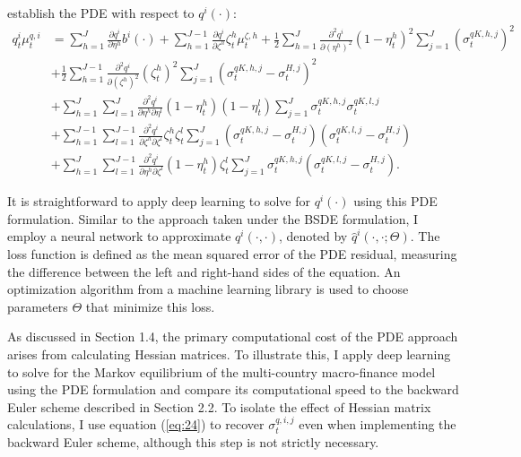 \documentclass{article}
\begin{document}
establish the PDE with respect to $q^{i}(\cdot)$:
\begin{align*}
q_{t}^{i}\mu_{t}^{q,i}&=\sum_{h=1}^{J}\frac{\partial q^{i}}{\partial\eta^{h}}b^{i}(\cdot)+\sum_{h=1}^{J-1}\frac{\partial q^{i}}{\partial\zeta^{h}}\zeta_{t}^{h}\mu_{t}^{\zeta,h}+\frac{1}{2}\sum_{h=1}^{J}\frac{\partial^{2}q^{i}}{\partial(\eta^{h})^{2}}(1-\eta_{t}^{h})^{2}\sum_{j=1}^{J}(\sigma_{t}^{qK,h,j})^{2} \\
&+\frac{1}{2}\sum_{h=1}^{J-1}\frac{\partial^{2}q^{i}}{\partial(\zeta^{h})^{2}}(\zeta_{t}^{h})^{2}\sum_{j=1}^{J}(\sigma_{t}^{qK,h,j}-\sigma_{t}^{H,j})^{2} \\
&+\sum_{h=1}^{J}\sum_{l=1}^{J}\frac{\partial^{2}q^{i}}{\partial\eta^{h}\partial\eta^{l}}(1-\eta_{t}^{h})(1-\eta_{t}^{l})\sum_{j=1}^{J}\sigma_{t}^{qK,h,j}\sigma_{t}^{qK,l,j} \\
&+\sum_{h=1}^{J-1}\sum_{l=1}^{J-1}\frac{\partial^{2}q^{i}}{\partial\zeta^{h}\partial\zeta^{l}}\zeta_{t}^{h}\zeta_{t}^{l}\sum_{j=1}^{J}(\sigma_{t}^{qK,h,j}-\sigma_{t}^{H,j})(\sigma_{t}^{qK,l,j}-\sigma_{t}^{H,j}) \\
&+\sum_{h=1}^{J}\sum_{l=1}^{J-1}\frac{\partial^{2}q^{i}}{\partial\eta^{h}\partial\zeta^{l}}(1-\eta_{t}^{h})\zeta_{t}^{l}\sum_{j=1}^{J}\sigma_{t}^{qK,h,j}(\sigma_{t}^{qK,l,j}-\sigma_{t}^{H,j}).
\end{align*}

It is straightforward to apply deep learning to solve for $q^{i}(\cdot)$ using this PDE formulation. Similar to the approach taken under the BSDE formulation, I employ a neural network to approximate $q^{i}(\cdot,\cdot)$, denoted by $\hat{q}^{i}(\cdot,\cdot;\Theta)$. The loss function is defined as the mean squared error of the PDE residual, measuring the difference between the left and right-hand sides of the equation. An optimization algorithm from a machine learning library is used to choose parameters $\Theta$ that minimize this loss.

As discussed in Section 1.4, the primary computational cost of the PDE approach arises from calculating Hessian matrices. To illustrate this, I apply deep learning to solve for the Markov equilibrium of the multi-country macro-finance model using the PDE formulation and compare its computational speed to the backward Euler scheme described in Section 2.2. To isolate the effect of Hessian matrix calculations, I use equation (\ref{eq:24}) to recover $\sigma_{t}^{q,i,j}$ even when implementing the backward Euler scheme, although this step is not strictly necessary.
\end{document}
